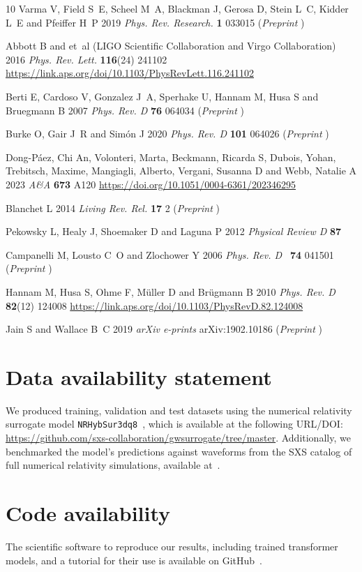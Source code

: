 \documentclass[12pt]{iopart}
\def\prd{{\it Phys. Rev.} D~}
\begin{document}
\begin{thebibliography}{10}
Varma V, Field S~E, Scheel M~A, Blackman J, Gerosa D, Stein L~C, Kidder L~E and
  Pfeiffer H~P 2019 {\em Phys. Rev. Research.\/} {\bf 1} 033015
  (\textit{Preprint} )

Abbott B and et~al (LIGO Scientific Collaboration and Virgo Collaboration) 2016
  {\em Phys. Rev. Lett.\/} {\bf 116}(24) 241102
  \urlprefix\url{https://link.aps.org/doi/10.1103/PhysRevLett.116.241102}

Berti E, Cardoso V, Gonzalez J~A, Sperhake U, Hannam M, Husa S and Bruegmann B
  2007 {\em Phys. Rev. D\/} {\bf 76} 064034 (\textit{Preprint}
  )

Burke O, Gair J~R and Sim\'on J 2020 {\em Phys. Rev. D\/} {\bf 101} 064026
  (\textit{Preprint} )

{Dong-Páez, Chi An}, {Volonteri, Marta}, {Beckmann, Ricarda S}, {Dubois,
  Yohan}, {Trebitsch, Maxime}, {Mangiagli, Alberto}, {Vergani, Susanna D} and
  {Webb, Natalie A} 2023 {\em A\&A\/} {\bf 673} A120
  \urlprefix\url{https://doi.org/10.1051/0004-6361/202346295}

Blanchet L 2014 {\em Living Rev. Rel.\/} {\bf 17} 2 (\textit{Preprint}
  )

Pekowsky L, Healy J, Shoemaker D and Laguna P 2012 {\em Physical Review D\/}
  {\bf 87}

{Campanelli} M, {Lousto} C~O and {Zlochower} Y 2006 {\em \prd\/} {\bf 74}
  041501 (\textit{Preprint} )

Hannam M, Husa S, Ohme F, M\"uller D and Br\"ugmann B 2010 {\em Phys. Rev. D\/}
  {\bf 82}(12) 124008
  \urlprefix\url{https://link.aps.org/doi/10.1103/PhysRevD.82.124008}

{Jain} S and {Wallace} B~C 2019 {\em arXiv e-prints\/} arXiv:1902.10186
  (\textit{Preprint} )

\end{thebibliography}


\section*{Data availability statement} 
We produced training, validation and test datasets using 
the numerical relativity surrogate 
model \texttt{NRHybSur3dq8}~\cite{2019PhRvD99f4045V}, 
which is available at the following URL/DOI: 
\url{https://github.com/sxs-collaboration/gwsurrogate/tree/master}.  Additionally, we benchmarked the model's predictions against waveforms from the SXS catalog of full numerical relativity simulations, available at~\cite{SXSCatalogData_3.0.0}.

\section*{Code availability}
The scientific software to reproduce our results, including trained transformer models, and a tutorial for their use is available 
on GitHub~\cite{githubhom}.
\end{document}
